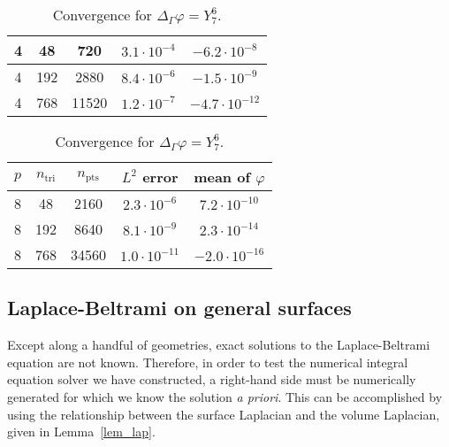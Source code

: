 \documentclass[11pt]{article}
\renewcommand{\phi}{\varphi}
\newcommand{\surflap}{\Delta_\Gamma}
\newcommand{\ntri}{n_{\text{tri}}}
\newcommand{\npts}{n_{\text{pts}}}
\numberwithin{equation}{section}
\begin{document}
\begin{table}[!t]
\begin{center}
\begin{subtable}[b]{.45\linewidth}
\begin{center}
\begin{tabular}{|ccc|cc|}
        4 & 48 & 720 &  $3.1 \cdot 10^{-4}$ & $-6.2 \cdot 10^{-8}$ \\ \hline
        4 & 192 & 2880 & $8.4 \cdot 10^{-6}$ & $-1.5 \cdot 10^{-9}$ \\ \hline
        4 & 768 & 11520 &  $1.2 \cdot 10^{-7}$ & $-4.7 \cdot 10^{-12}$ \\ \hline
      \end{tabular}
      \end{center}
    \end{subtable} \hfill
    \begin{subtable}[b]{.45\linewidth}
      \begin{center}
      \caption{Convergence for $\surflap \phi = Y^6_7$.}
      \begin{tabular}{|ccc|cc|} \hline
        $p$ & $\ntri$ & $\npts$ & $L^2$ error
              & mean of $\phi$ \\ \hline
        8 & 48 & 2160 &  $2.3 \cdot 10^{-6}$ & $7.2 \cdot 10^{-10}$ \\ \hline
        8 & 192 & 8640 & $8.1 \cdot 10^{-9}$ & $2.3 \cdot 10^{-14}$ \\ \hline
        8 & 768  & 34560 & $1.0 \cdot 10^{-11}$ & $-2.0 \cdot 10^{-16}$ \\ \hline
      \end{tabular}
      \end{center}
    \end{subtable}
  \end{center}
\end{table}






\subsection{Laplace-Beltrami on general surfaces}

Except along a handful of geometries, exact solutions to the
Laplace-Beltrami equation are not known. Therefore, in order to test
the numerical integral equation solver we have constructed, a
right-hand side must be numerically generated for which we know the
solution \emph{a priori}. This can be accomplished by using the
relationship between the surface Laplacian and the volume Laplacian,
given in Lemma~\ref{lem_lap}.
\end{document}
